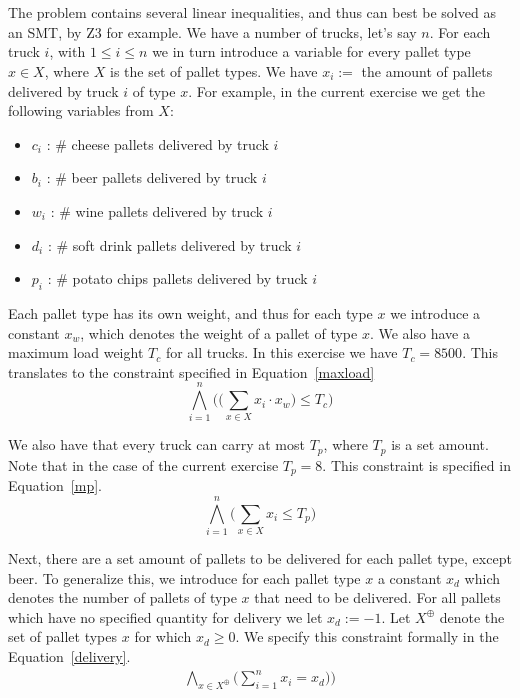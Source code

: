 \chapter{}\label{chp:1}
The problem contains several linear inequalities, and thus can best be solved as an SMT, by Z3 for example. We have a number of trucks, let's say $n$. For each truck $i$, with $1 \leq i \leq n$ we in turn introduce a variable for every pallet type $x \in X$, where $X$ is the set of pallet types. We have $x_i :=$ the amount of pallets delivered by truck $i$ of type $x$. For example, in the current exercise we get the following variables from $X$:
\begin{itemize}
    \item $c_i$ : # cheese pallets delivered by truck $i$
    \item $b_i$ : # beer pallets delivered by truck $i$
    \item $w_i$ : # wine pallets delivered by truck $i$
    \item $d_i$ : # soft drink pallets delivered by truck $i$
    \item $p_i$ : # potato chips pallets delivered by truck $i$
\end{itemize}

Each pallet type has its own weight, and thus for each type $x$ we introduce a constant $x_w$, which denotes the weight of a pallet of type $x$. We also have a maximum load weight $T_c$ for all trucks. In this exercise we have $T_c = 8500$. This translates to the constraint specified in Equation~\ref{maxload}
\begin{equation}
    \label{maxload}
    \bigwedge^{n}_{i=1}\bigg(\big(\sum_{x \in X} x_i \cdot x_w\big) \leq T_c \bigg)
\end{equation}

We also have that every truck can carry at most $T_p$, where $T_p$ is a set amount. Note that in the case of the current exercise $T_p = 8$. This constraint is specified in Equation~\ref{mp}.
\begin{equation}
    \label{mp}
    \bigwedge^{n}_{i=1}\bigg(\sum_{x \in X} x_i \leq T_p\bigg)
\end{equation}

Next, there are a set amount of pallets to be delivered for each pallet type, except beer. To generalize this, we introduce for each pallet type $x$ a constant $x_d$ which denotes the number of pallets of type $x$ that need to be delivered. For all pallets which have no specified quantity for delivery we let $x_d := -1$. Let $X^{\oplus}$ denote the set of pallet types $x$ for which $x_d \geq 0$. We specify this constraint formally in the Equation~\ref{delivery}.
\begin{equation}
    \begin{aligned}
    \label{delivery}
    \bigwedge_{x \in X^{\oplus}}\bigg(\sum^{n}_{i=1} x_i = x_d)\bigg)
    \end{aligned}
\end{equation}


